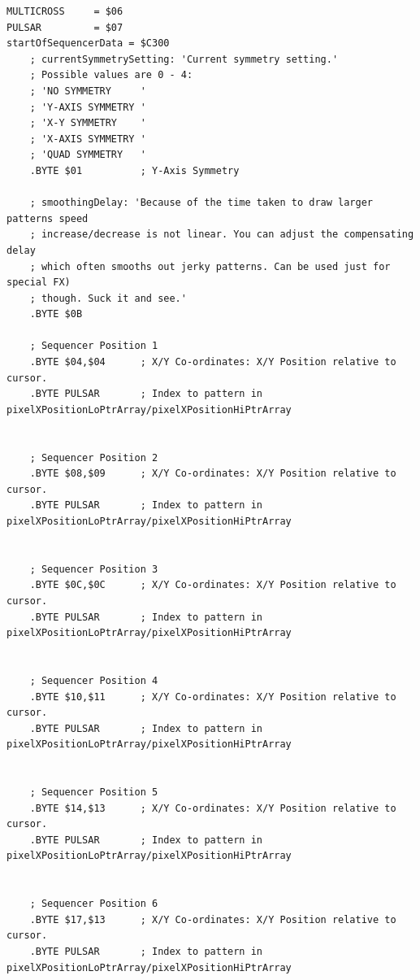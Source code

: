 \begin{lstlisting}[basicstyle=\ttfamily\tiny,caption=Sequencer definition in \icode{sequencer\_data.asm}.]
MULTICROSS     = $06
PULSAR         = $07
startOfSequencerData = $C300
    ; currentSymmetrySetting: 'Current symmetry setting.'                     
    ; Possible values are 0 - 4:                                              
    ; 'NO SYMMETRY     '                                                      
    ; 'Y-AXIS SYMMETRY '                                                      
    ; 'X-Y SYMMETRY    '                                                      
    ; 'X-AXIS SYMMETRY '                                                      
    ; 'QUAD SYMMETRY   '                                                      
    .BYTE $01          ; Y-Axis Symmetry

    ; smoothingDelay: 'Because of the time taken to draw larger patterns speed
    ; increase/decrease is not linear. You can adjust the compensating delay
    ; which often smooths out jerky patterns. Can be used just for special FX)
    ; though. Suck it and see.'                                               
    .BYTE $0B

    ; Sequencer Position 1
    .BYTE $04,$04      ; X/Y Co-ordinates: X/Y Position relative to cursor.   
    .BYTE PULSAR       ; Index to pattern in pixelXPositionLoPtrArray/pixelXPositionHiPtrArray   
    

    ; Sequencer Position 2
    .BYTE $08,$09      ; X/Y Co-ordinates: X/Y Position relative to cursor.   
    .BYTE PULSAR       ; Index to pattern in pixelXPositionLoPtrArray/pixelXPositionHiPtrArray   
    

    ; Sequencer Position 3
    .BYTE $0C,$0C      ; X/Y Co-ordinates: X/Y Position relative to cursor.   
    .BYTE PULSAR       ; Index to pattern in pixelXPositionLoPtrArray/pixelXPositionHiPtrArray   
    

    ; Sequencer Position 4
    .BYTE $10,$11      ; X/Y Co-ordinates: X/Y Position relative to cursor.   
    .BYTE PULSAR       ; Index to pattern in pixelXPositionLoPtrArray/pixelXPositionHiPtrArray   
    

    ; Sequencer Position 5
    .BYTE $14,$13      ; X/Y Co-ordinates: X/Y Position relative to cursor.   
    .BYTE PULSAR       ; Index to pattern in pixelXPositionLoPtrArray/pixelXPositionHiPtrArray   
    

    ; Sequencer Position 6
    .BYTE $17,$13      ; X/Y Co-ordinates: X/Y Position relative to cursor.   
    .BYTE PULSAR       ; Index to pattern in pixelXPositionLoPtrArray/pixelXPositionHiPtrArray   
    


\end{lstlisting}
